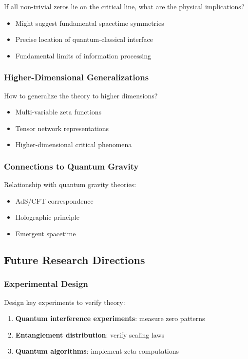 \documentclass[11pt]{article}
\theoremstyle{plain}
\theoremstyle{definition}
\theoremstyle{remark}
\begin{document}
If all non-trivial zeros lie on the critical line, what are the physical implications?
\begin{itemize}
\item Might suggest fundamental spacetime symmetries
\item Precise location of quantum-classical interface
\item Fundamental limits of information processing
\end{itemize}

\subsubsection{Higher-Dimensional Generalizations}

How to generalize the theory to higher dimensions?
\begin{itemize}
\item Multi-variable zeta functions
\item Tensor network representations
\item Higher-dimensional critical phenomena
\end{itemize}

\subsubsection{Connections to Quantum Gravity}

Relationship with quantum gravity theories:
\begin{itemize}
\item AdS/CFT correspondence
\item Holographic principle
\item Emergent spacetime
\end{itemize}

\subsection{Future Research Directions}

\subsubsection{Experimental Design}

Design key experiments to verify theory:
\begin{enumerate}
\item \textbf{Quantum interference experiments}: measure zero patterns
\item \textbf{Entanglement distribution}: verify scaling laws
\item \textbf{Quantum algorithms}: implement zeta computations
\end{enumerate}
\end{document}

